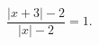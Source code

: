 \begin{ex}[type=equation]
	\begin{condition}
		$\dfrac{\big|x + 3\big| - 2}{\big|x\big| - 2} = 1.$
	\end{condition}
\end{ex}